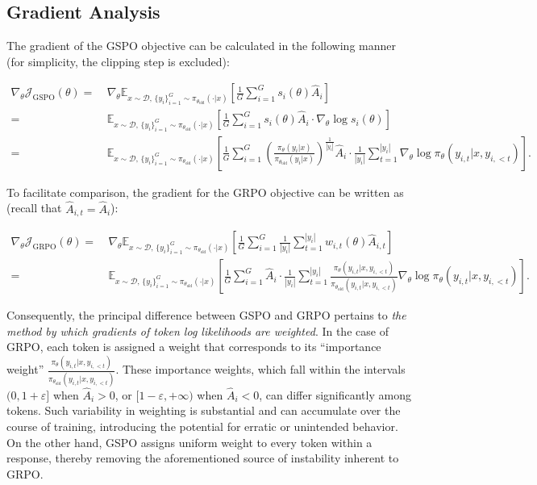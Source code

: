 \subsection{Gradient Analysis}
\label{subsec:gradient}

The gradient of the GSPO objective can be calculated in the following manner (for simplicity, the clipping step is excluded):

\begin{align}
\nabla_{\theta} \mathcal{J}_\text{GSPO} (\theta)
=&\ 
\nabla_{\theta} \mathbb{E}_{ x \sim \mathcal{D},\, \{y_i\}_{i=1}^G \sim \pi_{\theta_\text{old}}( \cdot | x) }
\left[ 
\frac{1}{G} \sum_{i=1}^{G} s_{i}(\theta) \widehat{A}_{i}
\right] \\
= &\ 
\mathbb{E}_{ x \sim \mathcal{D},\, \{y_i\}_{i=1}^G \sim \pi_{\theta_\text{old}}( \cdot | x) }
\left[ 
\frac{1}{G} \sum_{i=1}^{G}
s_{i}(\theta) \widehat{A}_{i}
\cdot \nabla_{\theta} \log s_{i}(\theta)
\right] \\
=&\ 
\mathbb{E}_{ x \sim \mathcal{D},\, \{y_i\}_{i=1}^G \sim \pi_{\theta_\text{old}}( \cdot | x) }
\left[ 
\frac{1}{G} \sum_{i=1}^{G} 
\left( \frac{ \pi_{\theta} (y_i | x) }{ \pi_{\theta_\text{old}} (y_i | x)} \right)^{\frac{1}{|y_i|}} \widehat{A}_{i} 
\cdot \frac{1}{|y_i|} \sum_{t=1}^{|y_i|} \nabla_{\theta} \log \pi_{\theta} (y_{i,t} | x, y_{i,<t}) 
\right].
\label{equ:gspo_grad}
\end{align}

To facilitate comparison, the gradient for the GRPO objective can be written as (recall that $\widehat{A}_{i,t} = \widehat{A}_{i}$):

\begin{align}
\nabla_{\theta} \mathcal{J}_\text{GRPO} (\theta) 
=&\ 
\nabla_{\theta} \mathbb{E}_{ x \sim \mathcal{D},\, \{y_i\}_{i=1}^G \sim \pi_{\theta_\text{old}}( \cdot | x) }
\left[ \frac{1}{G} \sum_{i=1}^{G} \frac{1}{|y_i|} \sum_{t=1}^{|y_i|} 
w_{i,t}(\theta) \widehat{A}_{i,t}
\right] \\
=&\
\mathbb{E}_{ x \sim \mathcal{D},\, \{y_i\}_{i=1}^G \sim \pi_{\theta_\text{old}}( \cdot | x) }
\left[ \frac{1}{G} \sum_{i=1}^{G} \widehat{A}_{i} 
\cdot \frac{1}{|y_i|} \sum_{t=1}^{|y_i|} 
\frac{ \pi_{\theta} (y_{i,t} | x, y_{i,<t}) }{ \pi_{\theta_\text{old}} (y_{i,t} | x,y_{i,<t})} 
\nabla_{\theta} \log \pi_{\theta} (y_{i,t} | x, y_{i,<t})  
\right].
\end{align}

Consequently, the principal difference between GSPO and GRPO pertains to \textit{the method by which gradients of token log likelihoods are weighted}. In the case of GRPO, each token is assigned a weight that corresponds to its ``importance weight'' $\frac{ \pi_{\theta} (y_{i,t} | x, y_{i,<t}) }{ \pi_{\theta_\text{old}} (y_{i,t} | x,y_{i,<t})}$. These importance weights, which fall within the intervals $(0, 1+\varepsilon]$ when $\widehat{A}_{i} >0$, or $[1-\varepsilon, +\infty)$ when $\widehat{A}_{i} < 0$, can differ significantly among tokens. Such variability in weighting is substantial and can accumulate over the course of training, introducing the potential for erratic or unintended behavior. On the other hand, GSPO assigns uniform weight to every token within a response, thereby removing the aforementioned source of instability inherent to GRPO.

